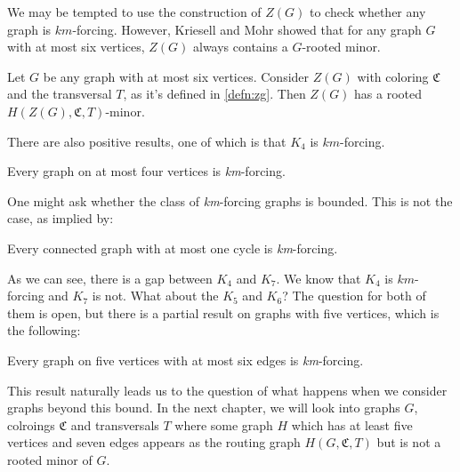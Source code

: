 We may be tempted to use the construction of \( Z(G) \) to check whether any graph is \( km \)-forcing. 
However, Kriesell and Mohr showed that for any graph \( G \) with at most six vertices, \( Z(G) \) always contains a \( G \)-rooted minor.

\begin{thm}\label{thm:zg-for-k_6}
    Let $G$ be any graph with at most six vertices. Consider $Z(G)$ with coloring
    $\mathfrak{C}$ and the transversal $T$, as it's defined in \ref{defn:zg}. Then $Z(G)$ has a 
    rooted $H(Z(G), \mathfrak{C}, T)$-minor.
\end{thm}


There are also positive results, one of which is that $K_4$ is $km$-forcing.

\begin{thm}\label{thm:6}
Every graph on at most four vertices is \textit{km}-forcing.
\end{thm}

One might ask whether the class of \textit{km}-forcing graphs is bounded. 
This is not the case, as implied by:

\begin{thm}\label{thm:4}
Every connected graph with at most one cycle is \textit{km}-forcing.
\end{thm}

As we can see, there is a gap between $K_4$ and $K_7$. We know that $K_4$ is $km$-forcing and $K_7$ is not. What about the $K_5$ and $K_6$? The question for both of them is open, but there is a partial result on graphs with five 
vertices, which is the following:

\begin{thm}\label{thm:5}
Every graph on five vertices with at most six edges is \textit{km}-forcing.
\end{thm}

This result naturally leads us to the question of what happens when we consider graphs beyond this bound. 
In the next chapter, we will look into graphs \( G \), colroings $\mathfrak{C}$ and transversals
$T$ where some graph \( H \) which has at least five vertices and 
seven edges appears as the routing graph \( H(G, \mathfrak{C}, T) \) but is not a rooted minor of \( G \).